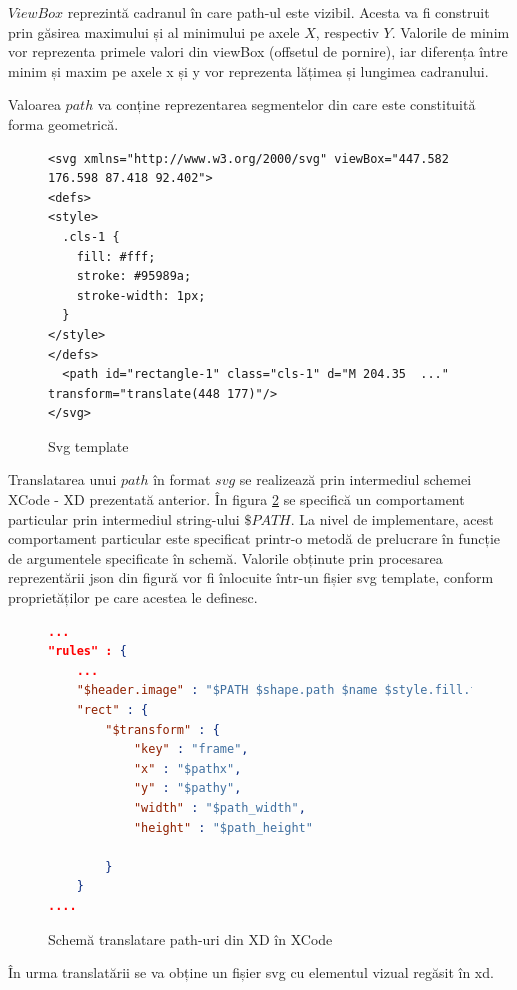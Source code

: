 $ViewBox$ reprezintă cadranul în care path-ul este vizibil. Acesta va fi construit prin găsirea maximului și al minimului pe axele $X$, respectiv $Y$. Valorile de minim vor reprezenta primele valori din viewBox (offsetul de pornire), iar diferența între minim și maxim pe axele x și y vor reprezenta lățimea și lungimea cadranului.

Valoarea $path$ va conține reprezentarea segmentelor din care este constituită forma geometrică.

\begin{figure}[!htbp]
\lstset{language=XML}
\begin{lstlisting}
<svg xmlns="http://www.w3.org/2000/svg" viewBox="447.582 176.598 87.418 92.402">
<defs>
<style>
  .cls-1 {
    fill: #fff;
    stroke: #95989a;
    stroke-width: 1px;
  }
</style>
</defs>
  <path id="rectangle-1" class="cls-1" d="M 204.35  ..." transform="translate(448 177)"/>
</svg>
\end{lstlisting}
\caption{Svg template}\label{fig:svg}
\end{figure}

Translatarea unui $path$ în format $svg$ se realizează prin intermediul schemei XCode - XD prezentată anterior. În figura \ref{fig:PathExport} se specifică un comportament particular prin intermediul string-ului $\$PATH$. La nivel de implementare, acest comportament particular este specificat printr-o metodă de prelucrare în funcție de argumentele specificate în schemă. Valorile obținute prin procesarea reprezentării json din figură vor fi înlocuite într-un fișier svg template, conform proprietăților pe care acestea le definesc. 

\begin{figure}[!htbp]
\begin{lstlisting}[language=json,firstnumber=1]
...
"rules" : {
    ...
    "$header.image" : "$PATH $shape.path $name $style.fill.type $style.fill.color.value $transform $style.stroke.color.value $style.stroke.width",
    "rect" : {
        "$transform" : {
            "key" : "frame",
            "x" : "$pathx",
            "y" : "$pathy",
            "width" : "$path_width",
            "height" : "$path_height"
                        
        }
    }
....
\end{lstlisting}
\caption{Schemă translatare path-uri din XD în XCode} \label{fig:PathExport}
\end{figure}


În urma translatării se va obține un fișier svg cu elementul vizual regăsit în xd. 

